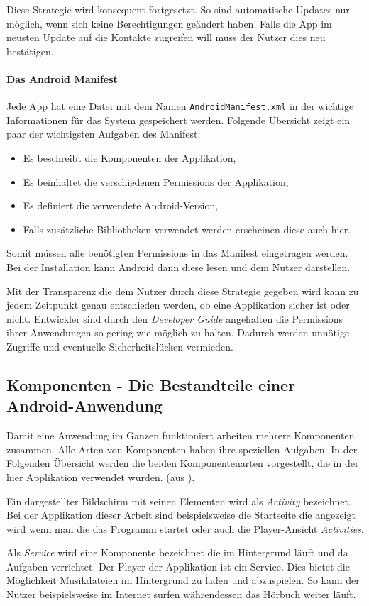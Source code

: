 Diese Strategie wird konsequent fortgesetzt. So sind automatische Updates nur möglich, wenn sich keine Berechtigungen geändert haben. Falls die App im neusten Update auf die Kontakte zugreifen will muss der Nutzer dies neu bestätigen.

\paragraph{Das Android Manifest}
Jede App hat eine Datei mit dem Namen \verb+AndroidManifest.xml+ in der wichtige Informationen für das System gespeichert werden. Folgende Übersicht zeigt ein paar der wichtigsten Aufgaben des Manifest:

\begin{itemize}
	\item Es beschreibt die Komponenten der Applikation,
	\item Es beinhaltet die verschiedenen Permissions der Applikation,
	\item Es definiert die verwendete Android-Version,
	\item Falls zusätzliche Bibliotheken verwendet werden erscheinen diese auch hier.
\end{itemize}

Somit müssen alle benötigten Permissions in das Manifest eingetragen werden. Bei der Installation kann Android dann diese lesen und dem Nutzer darstellen.

Mit der Transparenz die dem Nutzer durch diese Strategie gegeben wird kann zu jedem Zeitpunkt genau entschieden werden, ob eine Applikation sicher ist oder nicht. Entwickler sind durch den \emph{Developer Guide} \cite{android_api} angehalten die Permissions ihrer Anwendungen so gering wie möglich zu halten. Dadurch werden unnötige Zugriffe und eventuelle Sicherheitslücken vermieden.

\subsection{Komponenten - Die Bestandteile einer Android-Anwendung}
Damit eine Anwendung im Ganzen funktioniert arbeiten mehrere Komponenten zusammen. Alle Arten von Komponenten haben ihre speziellen Aufgaben. In der Folgenden Übersicht werden die beiden Komponentenarten vorgestellt, die in der hier Applikation verwendet wurden. (aus \cite{android_components}).

\begin{description}[style=nextline]
	\item[Activities] Ein dargestellter Bildschirm mit seinen Elementen wird als \emph{Activity} bezeichnet. Bei der Applikation dieser Arbeit sind beispielsweise die Startseite die angezeigt wird wenn man die das Programm startet oder auch die Player-Ansicht \emph{Activities}.
	\item[Services] Als \emph{Service} wird eine Komponente bezeichnet die im Hintergrund läuft und da Aufgaben verrichtet. Der Player der Applikation ist ein Service. Dies bietet die Möglichkeit Musikdateien im Hintergrund zu laden und abzuspielen. So kann der Nutzer beispielsweise im Internet surfen währendessen das Hörbuch weiter läuft.
\end{description}

